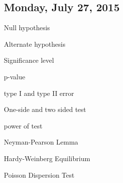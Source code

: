 \subsection{Monday, July 27, 2015}


Null hypothesis

Alternate hypothesis

Significance level

p-value

type I and type II error

One-side and two sided test

power of test

Neyman-Pearson Lemma

Hardy-Weinberg Equilibrium

Poisson Dispersion Test
